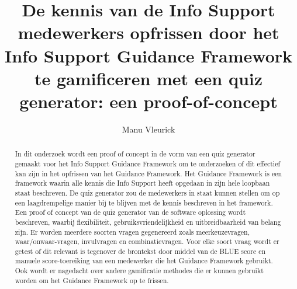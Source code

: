 \documentclass{hogent-article}
\title{De kennis van de Info Support medewerkers opfrissen door het Info Support Guidance Framework te gamificeren met een quiz generator: een proof-of-concept}
\author{Manu Vleurick}
\begin{document}
    
\begin{abstract}
In dit onderzoek wordt een proof of concept in de vorm van een quiz generator gemaakt voor het Info Support Guidance Framework om te onderzoeken of dit effectief kan zijn in het opfrissen van het Guidance Framework. Het Guidance Framework is een framework waarin alle kennis die Info Support heeft opgedaan in zijn hele loopbaan staat beschreven. De quiz generator zou de medewerkers in staat kunnen stellen om op een laagdrempelige manier bij te blijven met de kennis beschreven in het framework. Een proof of concept van de quiz generator van de software oplossing wordt beschreven, waarbij flexibiliteit, gebruiksvriendelijkheid en uitbreidbaarheid van belang zijn. Er worden meerdere soorten vragen gegenereerd zoals meerkeuzevragen, waar/onwaar-vragen, invulvragen en combinatievragen. Voor elke soort vraag wordt er getest of dit relevant is tegenover de brontekst door middel van de BLUE score en manuele score-toereiking van een medewerker die het Guidance Framework gebruikt. Ook wordt er nagedacht over andere gamificatie methodes die er kunnen gebruikt worden om het Guidance Framework op te frissen.

\end{abstract}
    
\tableofcontents
    


\printbibliography[heading=bibintoc]
    
\end{document}
